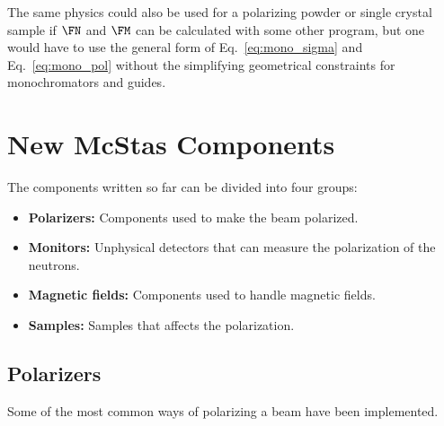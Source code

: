 The same physics could also be used for a polarizing powder or single crystal
sample if $\FN$ and $\FM$ can be calculated with some other program, but one
would have to use the general form of Eq.~\ref{eq:mono_sigma} and
Eq.~\ref{eq:mono_pol} without the simplifying geometrical constraints for
monochromators and guides.

\section{New McStas Components}
\label{sec:new}

The components written so far can be divided into four groups:
\begin{itemize}
\item \textbf{Polarizers:} Components used to make the beam polarized.
\item \textbf{Monitors:} Unphysical detectors that can measure the polarization
of the neutrons.
\item \textbf{Magnetic fields:} Components used to handle magnetic fields.
\item \textbf{Samples:} Samples that affects the polarization.
\end{itemize}

\subsection{Polarizers}

Some of the most common ways of polarizing a beam have been
implemented.

